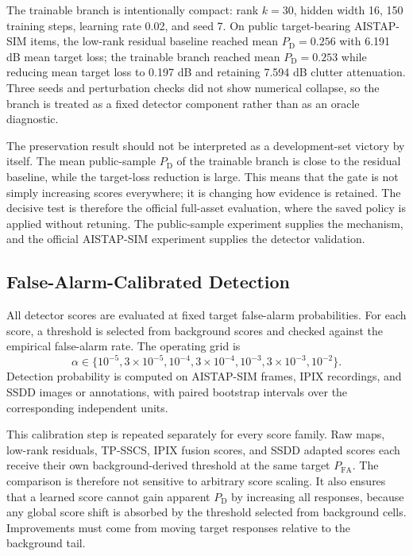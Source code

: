 \documentclass[journal]{IEEEtran}
\begin{document}
The trainable branch is intentionally compact: rank $k=30$, hidden width 16, 150 training steps, learning rate 0.02, and seed 7. On public target-bearing AISTAP-SIM items, the low-rank residual baseline reached mean $P_{\mathrm{D}}=0.256$ with 6.191 dB mean target loss; the trainable branch reached mean $P_{\mathrm{D}}=0.253$ while reducing mean target loss to 0.197 dB and retaining 7.594 dB clutter attenuation. Three seeds and perturbation checks did not show numerical collapse, so the branch is treated as a fixed detector component rather than as an oracle diagnostic.

The preservation result should not be interpreted as a development-set victory by itself. The mean public-sample $P_{\mathrm{D}}$ of the trainable branch is close to the residual baseline, while the target-loss reduction is large. This means that the gate is not simply increasing scores everywhere; it is changing how evidence is retained. The decisive test is therefore the official full-asset evaluation, where the saved policy is applied without retuning. The public-sample experiment supplies the mechanism, and the official AISTAP-SIM experiment supplies the detector validation.

\subsection{False-Alarm-Calibrated Detection}

All detector scores are evaluated at fixed target false-alarm probabilities. For each score, a threshold is selected from background scores and checked against the empirical false-alarm rate. The operating grid is
\begin{equation}
    \alpha \in \{10^{-5}, 3\times10^{-5}, 10^{-4}, 3\times10^{-4},
    10^{-3}, 3\times10^{-3}, 10^{-2}\}.
\end{equation}
Detection probability is computed on AISTAP-SIM frames, IPIX recordings, and SSDD images or annotations, with paired bootstrap intervals over the corresponding independent units.

This calibration step is repeated separately for every score family. Raw maps, low-rank residuals, TP-SSCS, IPIX fusion scores, and SSDD adapted scores each receive their own background-derived threshold at the same target $P_{\mathrm{FA}}$. The comparison is therefore not sensitive to arbitrary score scaling. It also ensures that a learned score cannot gain apparent $P_{\mathrm{D}}$ by increasing all responses, because any global score shift is absorbed by the threshold selected from background cells. Improvements must come from moving target responses relative to the background tail.
\end{document}
